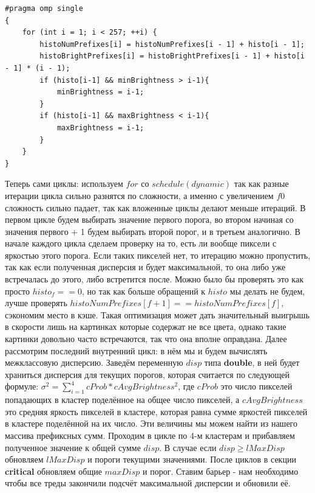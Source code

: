 \documentclass{article}
\begin{document}
\begin{lstlisting}[label=precalc,caption=Предподсчёт]
#pragma omp single
{
	for (int i = 1; i < 257; ++i) {
		histoNumPrefixes[i] = histoNumPrefixes[i - 1] + histo[i - 1];
		histoBrightPrefixes[i] = histoBrightPrefixes[i - 1] + histo[i - 1] * (i - 1);
		if (histo[i-1] && minBrightness > i-1){
			minBrightness = i-1;
		}
		if (histo[i-1] && maxBrightness < i-1){
			maxBrightness = i-1;
		}
	}
}
\end{lstlisting}
 Теперь сами циклы: используем $for$ со $schedule(dynamic)$ так как разные итерации цикла сильно разнятся по сложности, а именно с увеличением $f0$ сложность сильно падает, так как вложенные циклы делают меньше итераций. В первом цикле будем выбирать значение первого порога, во втором начиная со значения первого + 1 будем выбирать второй порог, и в третьем аналогично. В начале каждого цикла сделаем проверку на то, есть ли вообще пиксели с яркостью этого порога. Если таких пикселей нет, то итерацию можно пропустить, так как если полученная дисперсия и будет максимальной, то она либо уже встречалась до этого, либо встретится после. Можно было бы проверять это как просто $histo_f == 0$, но так как больше обращений к $histo$ мы делать не будем, лучше проверять $histoNumPrefixes[f+1] == histoNumPrefixes[f]$, сэкономим место в кэше. Такая оптимизация может дать значительный выигрышь в скорости лишь на картинках которые содержат не все цвета, однако такие картинки довольно часто встречаются, так что она вполне оправдана. Далее рассмотрим последний внутренний цикл: в нём мы и будем вычислять межклассовую дисперсию. Заведём переменную $disp$ типа \textbf{double}, в ней будет храниться дисперсия для текущих порогов, которая считается по следующей формуле: $\sigma^2 = \displaystyle\sum_{i=1} ^{4}cProb*cAvgBrightness^2$, где $cProb$ это число пикселей попадающих в кластер поделённое на общее число пикселей, а $cAvgBrightness$ это средняя яркость пикселей в кластере, которая равна сумме яркостей пикселей в кластере поделённой на их число. Эти величины мы можем найти из нашего массива префиксных сумм. Проходим в цикле по 4-м кластерам и прибавляем полученное значение к общей сумме $disp$. В случае если $disp \geq lMaxDisp$ обновляем $lMaxDisp$ и пороги текущими значениями. После циклов в секции \textbf{critical} обновляем общие $maxDisp$ и порог. Ставим барьер - нам необходимо чтобы все треды закончили подсчёт максимальной дисперсии и обновили её.
\end{document}
